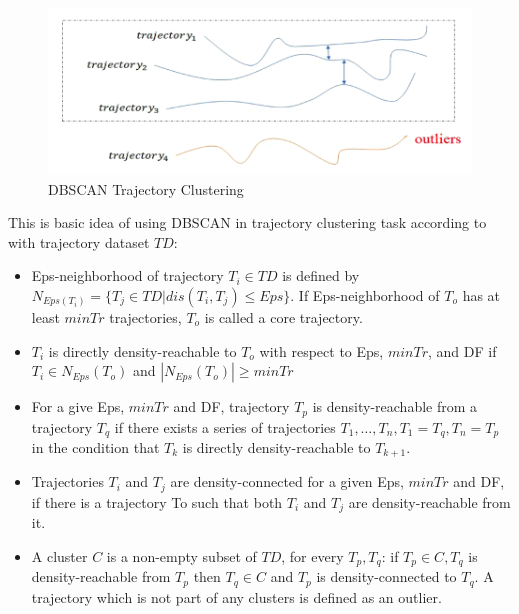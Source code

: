 \documentclass[a4paper, 12pt]{article}
\begin{document}
\begin{figure}[ht]
    \centering
    \includegraphics[width=1\textwidth]{DBSCAN Trajectory Clustering.png}
    \caption{DBSCAN Trajectory Clustering \citep{su2020survey}}
\end{figure}

This is basic idea of using DBSCAN in trajectory clustering task according to \cite{moayedi2019evaluation} with trajectory dataset $TD$:

\begin{itemize}
    \item Eps-neighborhood of trajectory $T_{i} \in TD$ is defined by $N_{Eps(T_{i})} = \{T_{j} \in TD|dis(T_{i}, T_{j}) \leq Eps\}$. If Eps-neighborhood of $T_{o}$ has at least $minTr$ trajectories, $T_{o}$ is called a core trajectory.
    \item $T_{i}$ is directly density-reachable to $T_{o}$ with respect to Eps, $minTr$, and DF if $T_{i} \in N_{Eps}(T_{o})$ and $|N_{Eps}(T_{o})| \geq minTr$ 
    \item For a give Eps, $minTr$ and DF, trajectory $T_{p}$ is density-reachable from a trajectory $T_{q}$ if there exists a series of trajectories $T_{1},\dots,T_{n}, T_{1}=T_{q}, T_{n}=T_{p}$ in the condition that $T_{k}$ is directly density-reachable to $T_{k+1}$.
    \item Trajectories $T_{i}$ and $T_{j}$ are density-connected for a given Eps, $minTr$ and DF, if there is a trajectory To such that both $T_{i}$ and $T_{j}$ are density-reachable from it.
    \item A cluster $C$ is a non-empty subset of $TD$, for every $T_{p}, T_{q}$: if $T_{p} \in C, T_{q}$ is density-reachable from $T_{p}$ then $T_{q} \in C$ and $T_{p}$ is density-connected to $T_{q}$. A trajectory which is not part of any clusters is defined as an outlier.
\end{itemize}
\end{document}
